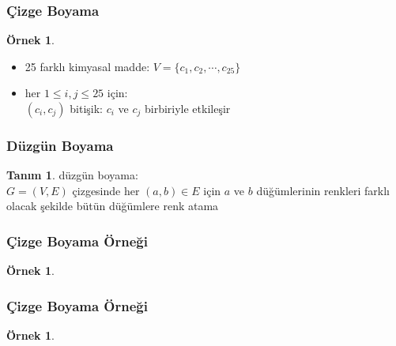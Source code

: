 \documentclass[dvipsnames]{beamer}
\theoremstyle{definition}
\newtheorem{tanim}[theorem]{Tanım}
\theoremstyle{example}
\newtheorem{ornek}[theorem]{Örnek}
\theoremstyle{plain}
\begin{document}
\begin{frame}
  \frametitle{Çizge Boyama}

  \begin{ornek}
    \begin{itemize}
      \item 25 farklı kimyasal madde: $V = \{ c_1, c_2,\cdots, c_{25}\}$
      \item her $1 \leq i, j \leq 25$ için:\\
        $(c_i,c_j)$ bitişik: $c_i$ ve $c_j$ birbiriyle etkileşir
    \end{itemize}

    \begin{center}
    \end{center}
  \end{ornek}
\end{frame}

\begin{frame}
  \frametitle{Düzgün Boyama}

  \begin{tanim}
    \alert{düzgün boyama}:\\
      $G=(V,E)$ çizgesinde her $(a,b) \in E$ için $a$ ve $b$ düğümlerinin
      renkleri farklı olacak şekilde bütün düğümlere renk atama
  \end{tanim}
\end{frame}

\begin{frame}
  \frametitle{Çizge Boyama Örneği}

  \begin{ornek}
    \begin{center}
    \end{center}
  \end{ornek}
\end{frame}

\begin{frame}
  \frametitle{Çizge Boyama Örneği}

  \begin{ornek}
    \begin{columns}
      \begin{center}
      \end{center}

      \begin{center}
      \end{center}
    \end{columns}
  \end{ornek}
\end{frame}
\end{document}
